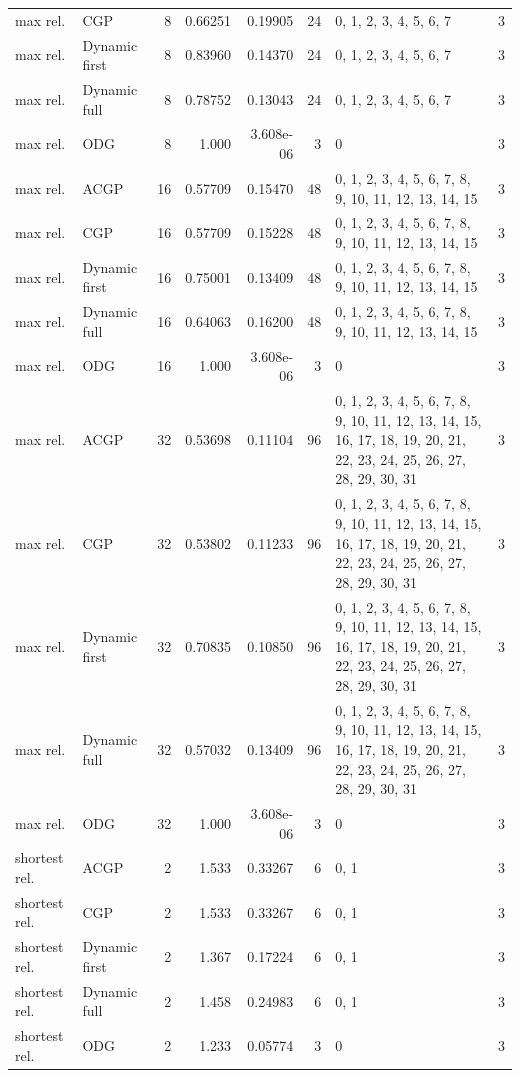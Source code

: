 \documentclass[10pt,a4paper]{article}
\begin{document}
\begin{longtable}{@{}p{23mm}p{29mm}rrrrp{36mm}r@{}}
max rel. & CGP & 8 & 0.66251 & 0.19905 & 24 & 0, 1, 2, 3, 4, 5, 6, 7 & 3 \\
max rel. & Dynamic first & 8 & 0.83960 & 0.14370 & 24 & 0, 1, 2, 3, 4, 5, 6, 7 & 3 \\
max rel. & Dynamic full & 8 & 0.78752 & 0.13043 & 24 & 0, 1, 2, 3, 4, 5, 6, 7 & 3 \\
max rel. & ODG & 8 & 1.000 & 3.608e-06 & 3 & 0 & 3 \\
max rel. & ACGP & 16 & 0.57709 & 0.15470 & 48 & 0, 1, 2, 3, 4, 5, 6, 7, 8, 9, 10, 11, 12, 13, 14, 15 & 3 \\
max rel. & CGP & 16 & 0.57709 & 0.15228 & 48 & 0, 1, 2, 3, 4, 5, 6, 7, 8, 9, 10, 11, 12, 13, 14, 15 & 3 \\
max rel. & Dynamic first & 16 & 0.75001 & 0.13409 & 48 & 0, 1, 2, 3, 4, 5, 6, 7, 8, 9, 10, 11, 12, 13, 14, 15 & 3 \\
max rel. & Dynamic full & 16 & 0.64063 & 0.16200 & 48 & 0, 1, 2, 3, 4, 5, 6, 7, 8, 9, 10, 11, 12, 13, 14, 15 & 3 \\
max rel. & ODG & 16 & 1.000 & 3.608e-06 & 3 & 0 & 3 \\
max rel. & ACGP & 32 & 0.53698 & 0.11104 & 96 & 0, 1, 2, 3, 4, 5, 6, 7, 8, 9, 10, 11, 12, 13, 14, 15, 16, 17, 18, 19, 20, 21, 22, 23, 24, 25, 26, 27, 28, 29, 30, 31 & 3 \\
max rel. & CGP & 32 & 0.53802 & 0.11233 & 96 & 0, 1, 2, 3, 4, 5, 6, 7, 8, 9, 10, 11, 12, 13, 14, 15, 16, 17, 18, 19, 20, 21, 22, 23, 24, 25, 26, 27, 28, 29, 30, 31 & 3 \\
max rel. & Dynamic first & 32 & 0.70835 & 0.10850 & 96 & 0, 1, 2, 3, 4, 5, 6, 7, 8, 9, 10, 11, 12, 13, 14, 15, 16, 17, 18, 19, 20, 21, 22, 23, 24, 25, 26, 27, 28, 29, 30, 31 & 3 \\
max rel. & Dynamic full & 32 & 0.57032 & 0.13409 & 96 & 0, 1, 2, 3, 4, 5, 6, 7, 8, 9, 10, 11, 12, 13, 14, 15, 16, 17, 18, 19, 20, 21, 22, 23, 24, 25, 26, 27, 28, 29, 30, 31 & 3 \\
max rel. & ODG & 32 & 1.000 & 3.608e-06 & 3 & 0 & 3 \\
shortest rel. & ACGP & 2 & 1.533 & 0.33267 & 6 & 0, 1 & 3 \\
shortest rel. & CGP & 2 & 1.533 & 0.33267 & 6 & 0, 1 & 3 \\
shortest rel. & Dynamic first & 2 & 1.367 & 0.17224 & 6 & 0, 1 & 3 \\
shortest rel. & Dynamic full & 2 & 1.458 & 0.24983 & 6 & 0, 1 & 3 \\
shortest rel. & ODG & 2 & 1.233 & 0.05774 & 3 & 0 & 3 \\

\end{longtable}
\end{document}
